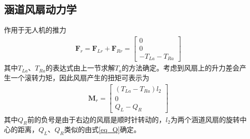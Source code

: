 \subsection{涵道风扇动力学}
作用于无人机的推力
\begin{align}
\bm{F}_{r}=\bm{F}_{{Lr}}+\bm{F}_{{Rr}}=\begin{bmatrix}
0\\0\\
-T_{La}-T_{Ra}
\end{bmatrix}
\end{align}
其中$ T_{{La}} $、$ T_{{Ra}} $的表达式由上一节求解$ T_a $的方法确定。考虑到风扇上的升力差会产生一个滚转力矩，因此风扇产生的扭矩可表示为
\begin{align}
\bm{M}_{r}=\begin{bmatrix}
(T_{La}-T_{Ra})l_2\\0\\
Q_{L}-Q_{R}
\end{bmatrix}	\label{eq_prop}
\end{align}
其中$ Q_{R} $前的负号是由于右边的风扇是顺时针转动的，$ l_2 $为两个涵道风扇的旋转中心的距离，$ Q_{L}$、$Q_{R} $类似的由式\eqref{eq_Q}确定。
%

